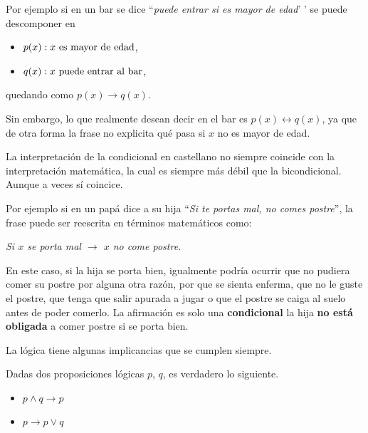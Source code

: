 \begin{ejemplo}
Por ejemplo si en un bar se dice ``{\em puede entrar si es mayor de edad}' '  se puede descomponer en
\begin{itemize}
\item $p(x): x \textup{ es mayor de edad}$,
\item $q(x): x \textup{ puede entrar al bar}$,
\end{itemize}

quedando como $p(x)\rightarrow q(x)$.

Sin embargo, lo que realmente desean decir en el bar es  $p(x)\leftrightarrow q(x)$, ya que de otra forma la frase no explicita qué pasa si $x$ no es mayor de edad.
\end{ejemplo}

La interpretación de la condicional en castellano no siempre coincide con la interpretación matemática, la cual es siempre más débil que la bicondicional.
Aunque a veces sí coincice.
\medskip

\begin{ejemplo}
Por ejemplo si en un papá dice a su hija ``{\em Si te portas mal, no comes postre}'', 
la frase puede ser reescrita en términos matemáticos como:

\medskip

\centerline{\em Si $x$ se porta mal $\rightarrow$ $x$ no come postre.}

En este caso, si la hija se porta bien, igualmente podría ocurrir que no pudiera comer su postre por alguna otra razón, por que se sienta enferma, que no le guste el postre, que tenga que salir apurada a jugar o que el postre se caiga al suelo antes de poder comerlo.
La afirmación es solo una \textbf{condicional} la hija \textbf{no está obligada} a comer postre si se porta bien.
\end{ejemplo}



\medskip

La lógica tiene algunas implicancias que se cumplen siempre.

\medskip

\begin{prop} 
Dadas dos proposiciones lógicas $p$, $q$, es verdadero lo siguiente.
\begin{itemize}
	\item $p\wedge q\rightarrow p$
	\item $p\rightarrow p\vee q$
\end{itemize}
\end{prop}

